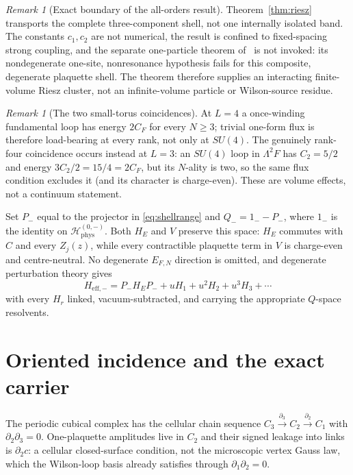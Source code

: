 \documentclass[11pt]{article}
\theoremstyle{plain}
\theoremstyle{definition}
\theoremstyle{remark}
\newtheorem{remark}[theorem]{Remark}
\newcommand{\CF}{C_F}
\begin{document}
\begin{remark}[Exact boundary of the all-orders result]
Theorem~\ref{thm:riesz} transports the complete three-component shell, not one
internally isolated band. The constants $c_1,c_2$ are not numerical, the
result is confined to fixed-spacing strong coupling, and the separate
one-particle theorem of~\cite{Yarotsky2004} is not invoked: its nondegenerate
one-site, nonresonance hypothesis fails for this composite, degenerate
plaquette shell. The theorem therefore supplies an interacting finite-volume
Riesz cluster, not an infinite-volume particle or Wilson-source residue.
\end{remark}

\begin{remark}[The two small-torus coincidences]
At $L=4$ a once-winding fundamental loop has energy $2\CF$ for every $N\ge3$;
trivial one-form flux is therefore load-bearing at every rank, not only at
$SU(4)$. The genuinely rank-four coincidence occurs instead at $L=3$: an
$SU(4)$ loop in $\Lambda^2F$ has $C_2=5/2$ and energy $3C_2/2=15/4=2\CF$, but
its $N$-ality is two, so the same flux condition excludes it (and its
character is charge-even). These are volume effects, not a continuum
statement.
\end{remark}

Set $P_-$ equal to the projector in \eqref{eq:shellrange} and
$Q_-=1_--P_-$, where $1_-$ is the identity on
$\mathcal H^{(0,-)}_{\mathrm{phys}}$. Both $H_E$ and $V$ preserve this space:
$H_E$ commutes with $C$ and every $Z_j(z)$, while every contractible plaquette
term in $V$ is charge-even and centre-neutral. No degenerate $E_{F,N}$
direction is omitted, and degenerate perturbation theory gives
\begin{equation}\label{eq:heff}
  H_{\mathrm{eff},-}=P_-H_EP_-+uH_1+u^2H_2+u^3H_3+\cdots
\end{equation}
with every $H_r$ linked, vacuum-subtracted, and carrying the appropriate
$Q$-space resolvents.

\section{Oriented incidence and the exact carrier}
\label{sec:carrier}

The periodic cubical complex has the cellular chain sequence
$C_3\xrightarrow{\partial_3}C_2\xrightarrow{\partial_2}C_1$ with
$\partial_2\partial_3=0$. One-plaquette amplitudes live in $C_2$ and their
signed leakage into links is $\partial_2c$: a cellular closed-surface
condition, not the microscopic vertex Gauss law, which the Wilson-loop basis
already satisfies through $\partial_1\partial_2=0$.
\end{document}
